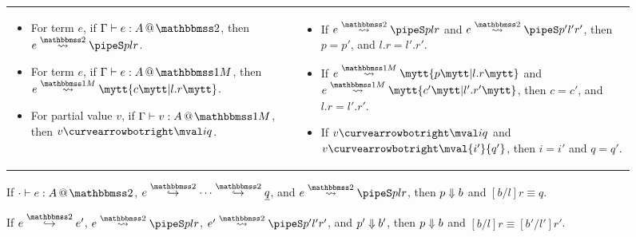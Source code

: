 
\begin{figure*}
\begin{abstrsyn}
\begin{tabular}{@{}ll@{}}
\begin{minipage}{0.43\textwidth} 
\begin{theorem}  \leavevmode
\label{thm:total} 
\begin{itemize} 
\item For term $e$, if $\typestwo e A$, then $\splittwo e A p l r$. 
\item For term $e$, if $\typesone e A$, then $\splitone e A c {l.r}$.
\item For partial value $v$, if $\typesone v A$, then $v \vsplito \mval i q$.
\end{itemize}
\end{theorem}
\end{minipage}
& 
\begin{minipage}{0.6\textwidth}
\begin{theorem}  \leavevmode
\label{thm:unique}
\begin{itemize} 
\item If $\splittwo e A p l r$ and $\splittwo e A {p'} {l'} {r'}$, then $p = p'$, and $l.r = l'.r'$.
\item If $\splitone e A p {l.r}$ and $\splitone e A {c'} {l'.r'}$, then $c = c'$, and $l.r = l'.r'$.
\item If $v \vsplito \mval i q$ and $v \vsplito \mval {i'} {q'}$, then $i = i'$ and $q = q'$.
\end{itemize}
\end{theorem}
\end{minipage}
\end{tabular}

\begin{theorem} 
\label{thm:allCorrect}
If $\typestwo [\cdot] e A$, $e \stepsym \bbtwo \cdots \stepsym \bbtwo \exv q$, and $\splittwo e A p l r$,
then ${p} \Downarrow {b}$ and $[b/l]r \equiv q$.
\end{theorem}

\begin{lemma} 
\label{lem:twoCorrect}
If $e \stepsym \bbtwo e'$, $\splittwo e A p  l r$, $\splittwo {e'} A {p'} {l'} {r'}$, and ${p'} \Downarrow {b'}$,
then ${p} \Downarrow {b}$ and $[b/l]r \equiv [b'/l']r'$.
\end{lemma}


\end{abstrsyn}
\end{figure*}
